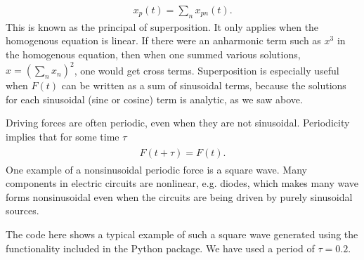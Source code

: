 \documentclass[letterpaper,10pt,english]{sphinxmanual}
\begin{document}
\begin{equation*}
\begin{split}
\begin{equation}
x_p(t)=\sum_nx_{pn}(t).
\label{_auto25} \tag{34}
\end{equation}
\end{split}
\end{equation*}
This is known as the principal of superposition. It only applies when
the homogenous equation is linear. If there were an anharmonic term
such as \(x^3\) in the homogenous equation, then when one summed various
solutions, \(x=(\sum_n x_n)^2\), one would get cross
terms. Superposition is especially useful when \(F(t)\) can be written
as a sum of sinusoidal terms, because the solutions for each
sinusoidal (sine or cosine)  term is analytic, as we saw above.

Driving forces are often periodic, even when they are not
sinusoidal. Periodicity implies that for some time \(\tau\)
\begin{equation*}
\begin{split}
\begin{eqnarray}
F(t+\tau)=F(t). 
\end{eqnarray}
\end{split}
\end{equation*}
One example of a non\sphinxhyphen{}sinusoidal periodic force is a square wave. Many
components in electric circuits are non\sphinxhyphen{}linear, e.g. diodes, which
makes many wave forms non\sphinxhyphen{}sinusoidal even when the circuits are being
driven by purely sinusoidal sources.

The code here shows a typical example of such a square wave generated using the functionality included in the  Python package. We have used a period of \(\tau=0.2\).
\end{document}
